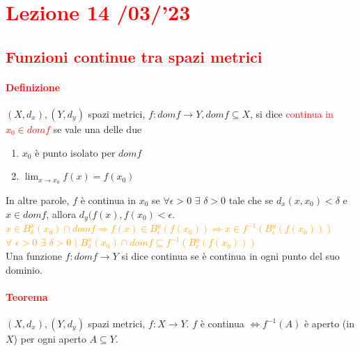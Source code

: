 \documentclass{article}
\begin{document}
\newpage
\section{\textcolor{red}{Lezione 14 \space{}/03/'23}}
\subsection{\textcolor{red}{Funzioni continue tra spazi metrici}}
\paragraph{\textcolor{red}{Definizione}}
$(X,d_x),(Y,d_y)$ spazi metrici, $f:domf \rightarrow Y, domf \subseteq X$, si dice \textcolor{red}{continua in $x_0 \in domf$} se vale una delle due
\begin{enumerate}
    \item $x_0$ è punto isolato per $domf$
    \item $\lim_{x \rightarrow x_0} f(x)=f(x_0)$
\end{enumerate}
In altre parole, $f$ è continua in $x_0$ se $\forall \epsilon >0\,\, \exists \,\,\delta >0$ tale che se $d_x(x,x_0)<\delta$ e $ x \in domf$, allora $d_y(f(x),f(x_0)<\epsilon$.\\
\textcolor{orange}{$x \in B_{\delta}^{x}(x_0)\cap domf \Rightarrow f(x) \in B_{\epsilon}^{y}(f(x_0))\Rightarrow x \in f^{-1}(B_{\epsilon}^{y}(f(x_0)))$}\\
\textcolor{orange}{$\forall \,\, \epsilon >0 \,\, \exists\,\, \delta >0 \,\, |\,\, B_{\delta}^{x}(x_0)\cap domf \subseteq f^{-1}(B_{\epsilon}^{y}(f(x_0)))$}\\
Una funzione $f:domf\rightarrow Y $ si dice continua se è continua in ogni punto del suo dominio.

\paragraph{\textcolor{red}{Teorema}}
$(X,d_x),(Y,d_y)$ spazi metrici, $f:X \rightarrow Y$. $f$ è continua $\Leftrightarrow f^{-1}(A)$ è aperto (in $X$) per ogni aperto $A \subseteq Y$.
\end{document}
